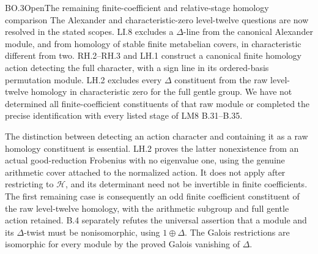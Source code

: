 \begin{statement}{BO.3}{Open}{The remaining finite-coefficient and relative-stage homology comparison}
The Alexander and characteristic-zero level-twelve questions
are now resolved in the stated scopes. LI.8 excludes a
$\Delta$-line from the canonical Alexander module, and from
homology of stable finite metabelian covers, in characteristic
different from two. RH.2--RH.3 and LH.1 construct a canonical
finite homology action detecting the full character, with a
sign line in its ordered-basis permutation module.
LH.2 excludes every $\Delta$ constituent from the raw
level-twelve homology in characteristic zero for the full
gentle group. We have not determined all finite-coefficient
constituents of that raw module or completed the precise
identification with every listed stage of LM8 B.31--B.35.
\end{statement}
The distinction between detecting an action character and
containing it as a raw homology constituent is essential.
LH.2 proves the latter nonexistence from an actual
good-reduction Frobenius with no eigenvalue one, using the
genuine arithmetic cover attached to the normalized action.
It does not apply after restricting to $\mathcal H$, and its
determinant need not be invertible in finite coefficients.
The first remaining case is consequently an odd finite
coefficient constituent of the raw level-twelve homology,
with the arithmetic subgroup and full gentle action retained.
B.4 separately
refutes the universal assertion that a module and its
$\Delta$-twist must be nonisomorphic, using
$1\oplus\Delta$. The Galois restrictions are isomorphic
for every module by the proved Galois vanishing of $\Delta$.
